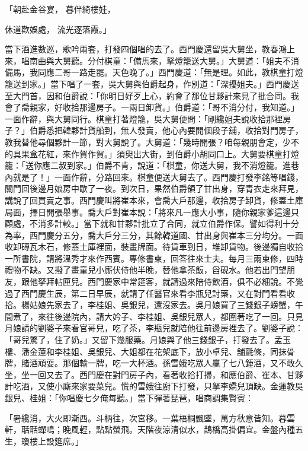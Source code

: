\begin{showcontents}{}
「朝赴金谷宴，  暮伴綺樓娃，

休道歡娛處，  流光逐落霞。」

當下酒進數巡，歌吟兩套，打發四個唱的去了。西門慶還留吳大舅坐，教春鴻上來，唱南曲與大舅聽。分付棋童：「備馬來，拏燈籠送大舅。」大舅道：「姐夫不消備馬，我同應二哥一路走罷。天色晚了。」西門慶道：「無是理。如此，教棋童打燈籠送到家。」當下唱了一套，吳大舅與伯爵起身，作別道：「深擾姐夫。」西門慶送至大門首，因和伯爵說：「你明日好歹上心，約會了那位甘夥計來見了批合同。我會了喬親家，好收拾那邊房子。一兩日卸貨。」伯爵道：「哥不消分付，我知道。」一面作辭，與大舅同行。棋童打著燈籠，吳大舅便問：「剛纔姐夫說收拾那裡房子？」伯爵悉把韓夥計貨船到，無人發賣，他心內要開個段子舖，收拾對門房子，教我替他尋個夥計一節，對大舅說了。大舅道：「幾時開張？咱每親朋會定，少不的具果盒花紅，來作賀作賀。」須臾出大街，到伯爵小胡同口上。大舅要棋童打燈籠：「送你應二叔到家。」伯爵不肯，說道：「棋童，你送大舅，我不消燈籠。進巷內就是了！」一面作辭，分路回來。棋童便送大舅去了。西門慶打發李銘等唱錢，關門回後邊月娘房中歇了一夜。到次日，果然伯爵領了甘出身，穿青衣走來拜見，講說了回買賣之事。西門慶叫將崔本來，會喬大戶那邊，收拾房子卸貨，修蓋土庫局面，擇日開張舉事。喬大戶對崔本說：「將來凡一應大小事，隨你親家爹這邊只顧處，不消多計較。」當下就和甘夥計批立了合同，就立伯爵作保。譬如得利十分為率，西門慶分五分，喬大戶分三分，其餘韓道國、甘出身與崔本三分均分。一面收卸磚瓦木石，修蓋土庫裡面，裝畫牌面。待貨車到日，堆卸貨物。後邊獨自收拾一所書院，請將溫秀才來作西賓。專修書柬，回答往來士夫。每月三兩束修，四時禮物不缺。又撥了畫童兒小廝伏侍他半晚，替他拿茶飯，舀硯水。他若出門望朋友，跟他拏拜帖匣兒。西門慶家中常筵客，就請過來陪侍飲酒，俱不必細說。不覺過了西門慶生辰，第二日早辰，就請了任醫官來看李瓶兒討藥，又在對門看看收拾。楊姑娘先家去了，李桂姐、吳銀兒，還沒家去。吳月娘買了三錢銀子螃蟹，午間煮了，來往後邊院內，請大妗子、李桂姐、吳銀兒眾人，都圍著吃了一回。只見月娘請的劉婆子來看官哥兒，吃了茶，李瓶兒就陪他往前邊房裡去了。劉婆子說：「哥兒驚了，住了奶。」又留下幾服藥。月娘與了他三錢銀子，打發去了。孟玉樓、潘金蓮和李桂姐、吳銀兒、大姐都在花架底下，放小卓兒、舖氈條，同抹骨牌，賭酒頑耍。那個輸一牌，吃一大杯酒。孫雪娥吃眾人贏了七八鍾酒，又不敢久坐，坐一回又去了。西門慶在對門房子內，看著收拾打掃，和應伯爵、崔本、甘夥計吃酒，又使小廝來家要菜兒。慌的雪娥往廚下打發，只拏李嬌兒頂缺。金蓮教吳銀兒、桂姐：「你唱慶七夕俺每聽。」當下彈著琵琶，唱商調集賢賓：

「暑纔消，大火即漸西。斗柄往，次宮移。一葉梧桐飄墜，萬方秋意皆知。暮雲軒，聒聒蟬鳴；晚風輕，點點螢飛。天階夜涼清似水，鵲橋高掛偏宜。金盤內種五生，瓊樓上設筵席。」


\end{showcontents}
